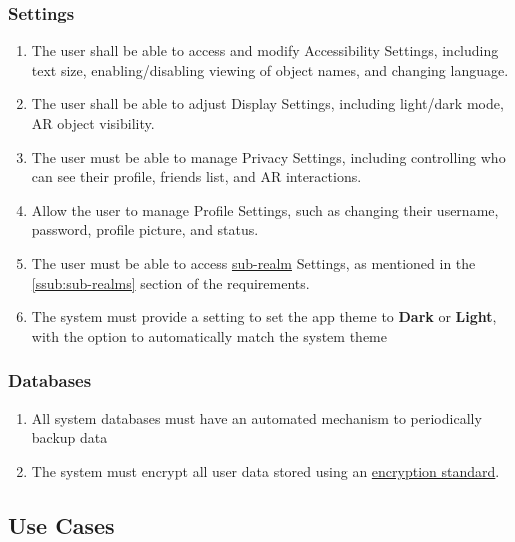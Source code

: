 \documentclass{article}
\begin{document}
\subsubsection{Settings}
\label{ssub:settings}
\begin{enumerate}[align=left, label=\textbf{S-FR\arabic*:}]
    \item The user shall be able to access and modify Accessibility Settings, including text size, enabling/disabling viewing of object names, and changing language.
    \item The user shall be able to adjust Display Settings, including light/dark mode, AR object visibility.
    \item The user must be able to manage Privacy Settings, including controlling who can see their profile, friends list, and AR interactions.
    \item Allow the user to manage Profile Settings, such as changing their username, password, profile picture, and status.
    \item The user must be able to access \hyperref[def:sub_realm]{sub-realm} Settings, as mentioned in the \ref{ssub:sub-realms} section of the requirements.
    \item The system must provide a setting to set the app theme to \textbf{Dark} or \textbf{Light}, with the option to automatically match the system theme \\
\end{enumerate}

\subsubsection{Databases}

\begin{enumerate}[align=left, label=\textbf{DB-FR\arabic*:}]
    \item All system databases must have an automated mechanism to periodically backup data \\
    \item The system must encrypt all user data stored using an \hyperref[def:encryption_standard]{encryption standard}. \\
\end{enumerate}

\subsection{Use Cases}
\label{sub:use_cases}
\end{document}
